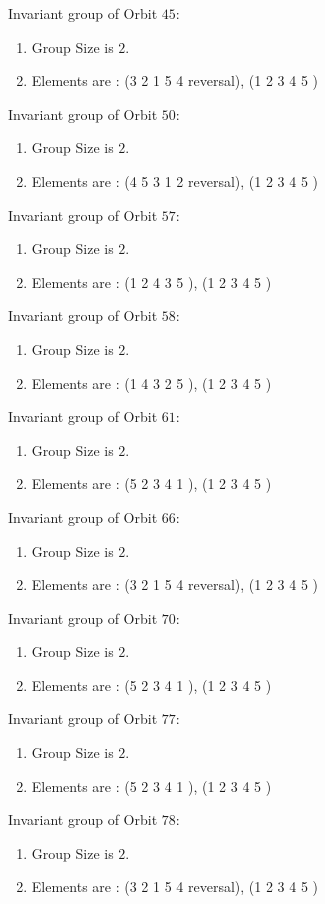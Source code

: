 \documentclass[12pt]{article}
\begin{document}
Invariant group of Orbit $45$:
\begin{enumerate}
\item Group Size is $2$.
\item Elements are : (3 2 1 5 4   reversal), (1 2 3 4 5  )
\end{enumerate}
Invariant group of Orbit $50$:
\begin{enumerate}
\item Group Size is $2$.
\item Elements are : (4 5 3 1 2   reversal), (1 2 3 4 5  )
\end{enumerate}
Invariant group of Orbit $57$:
\begin{enumerate}
\item Group Size is $2$.
\item Elements are : (1 2 4 3 5  ), (1 2 3 4 5  )
\end{enumerate}
Invariant group of Orbit $58$:
\begin{enumerate}
\item Group Size is $2$.
\item Elements are : (1 4 3 2 5  ), (1 2 3 4 5  )
\end{enumerate}
Invariant group of Orbit $61$:
\begin{enumerate}
\item Group Size is $2$.
\item Elements are : (5 2 3 4 1  ), (1 2 3 4 5  )
\end{enumerate}
Invariant group of Orbit $66$:
\begin{enumerate}
\item Group Size is $2$.
\item Elements are : (3 2 1 5 4   reversal), (1 2 3 4 5  )
\end{enumerate}
Invariant group of Orbit $70$:
\begin{enumerate}
\item Group Size is $2$.
\item Elements are : (5 2 3 4 1  ), (1 2 3 4 5  )
\end{enumerate}
Invariant group of Orbit $77$:
\begin{enumerate}
\item Group Size is $2$.
\item Elements are : (5 2 3 4 1  ), (1 2 3 4 5  )
\end{enumerate}
Invariant group of Orbit $78$:
\begin{enumerate}
\item Group Size is $2$.
\item Elements are : (3 2 1 5 4   reversal), (1 2 3 4 5  )
\end{enumerate}
\end{document}
